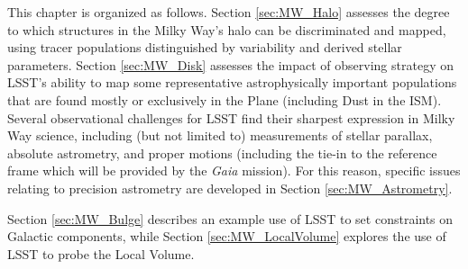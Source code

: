 This chapter is organized as follows. Section \ref{sec:MW_Halo}
assesses the degree to which structures in the Milky Way's halo can be
discriminated and mapped, using tracer populations distinguished by
variability and derived stellar parameters. Section \ref{sec:MW_Disk}
assesses the impact of observing strategy on LSST's ability to map
some representative astrophysically important populations that are
found mostly or exclusively in the Plane (including Dust in the
ISM). Several observational challenges for LSST find their sharpest
expression in Milky Way science, including (but not limited to)
measurements of stellar parallax, absolute astrometry, and proper
motions (including the tie-in to the reference frame which will be
provided by the {\it Gaia} mission). For this reason, specific issues
relating to precision astrometry are developed in Section
\ref{sec:MW_Astrometry}.

 Section \ref{sec:MW_Bulge}
describes an example use of LSST to set constraints on Galactic
components, while Section \ref{sec:MW_LocalVolume} explores the use of
LSST to probe the Local Volume.






